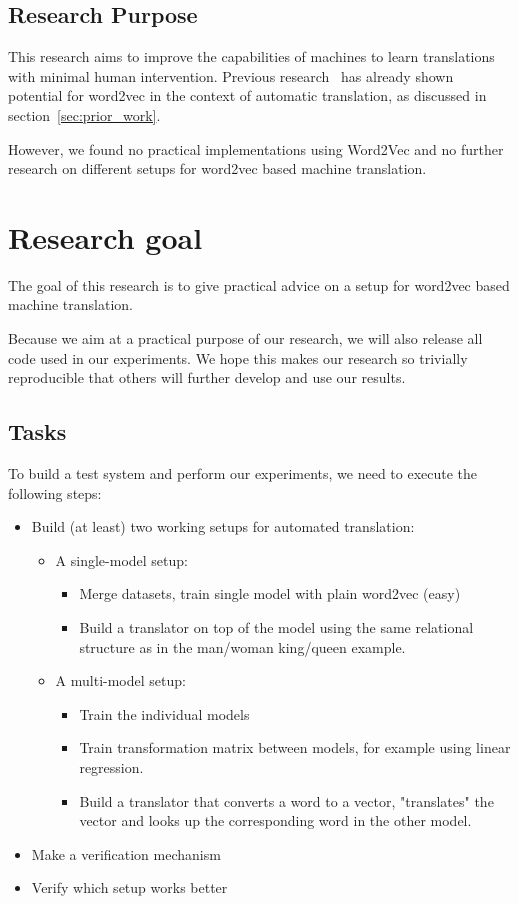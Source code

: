 \subsection{Research Purpose}
This research aims to improve the capabilities of machines to learn translations with minimal human intervention. Previous research~\cite{mikolov2013exploiting, wolf2014joint} has already shown potential for word2vec in the context of automatic translation, as discussed in section~\ref{sec:prior_work}.

However, we found no practical implementations using Word2Vec and no further research on different setups for word2vec based machine translation.

\section{Research goal}
The goal of this research is to give practical advice on a setup for word2vec based machine translation.

Because we aim at a practical purpose of our research, we will also release all code used in our experiments. We hope this makes our research so trivially reproducible that others will further develop and use our results.

\subsection{Tasks}
To build a test system and perform our experiments, we need to execute the following steps:

\begin{itemize}
  \item Build (at least) two working setups for automated translation:
    \begin{itemize}
      \item A single-model setup:
      \begin{itemize}
        \item Merge datasets, train single model with plain word2vec (easy)
        \item Build a translator on top of the model using the same relational structure as in the man/woman king/queen example.
      \end{itemize}
      \item A multi-model setup:
      \begin{itemize}
        \item Train the individual models
        \item Train transformation matrix between models, for example using linear regression.
        \item Build a translator that converts a word to a vector, "translates" the vector and looks up the corresponding word in the other model.
      \end{itemize}
    \end{itemize}
  \item Make a verification mechanism
  \item Verify which setup works better
\end{itemize}

